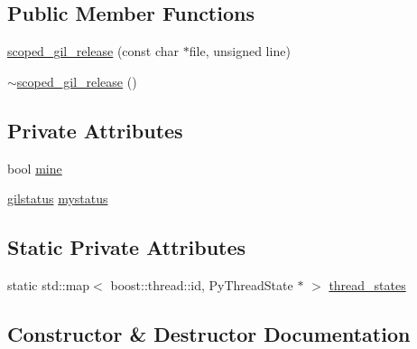 \subsection*{Public Member Functions}
\begin{DoxyCompactItemize}
\item 
\hyperlink{classecto_1_1py_1_1scoped__gil__release_afd4cb62267206421eca93969a8bb0865}{scoped\+\_\+gil\+\_\+release} (const char $\ast$file, unsigned line)
\item 
\hyperlink{classecto_1_1py_1_1scoped__gil__release_addd644daf557129d6584829cda6b9cc0}{$\sim$scoped\+\_\+gil\+\_\+release} ()
\end{DoxyCompactItemize}
\subsection*{Private Attributes}
\begin{DoxyCompactItemize}
\item 
bool \hyperlink{classecto_1_1py_1_1scoped__gil__release_a9e9fbf0c5819ac1b706437d99a6459a3}{mine}
\item 
\hyperlink{structecto_1_1py_1_1gilstatus}{gilstatus} \hyperlink{classecto_1_1py_1_1scoped__gil__release_a888a6813c86b9bbd2d5cd0d4a0f7e2f2}{mystatus}
\end{DoxyCompactItemize}
\subsection*{Static Private Attributes}
\begin{DoxyCompactItemize}
\item 
static std\+::map$<$ boost\+::thread\+::id, Py\+Thread\+State $\ast$ $>$ \hyperlink{classecto_1_1py_1_1scoped__gil__release_a5ecad50e9899f01f3779ac22009af5a4}{thread\+\_\+states}
\end{DoxyCompactItemize}


\subsection{Constructor \& Destructor Documentation}
\hypertarget{classecto_1_1py_1_1scoped__gil__release_afd4cb62267206421eca93969a8bb0865}{}

